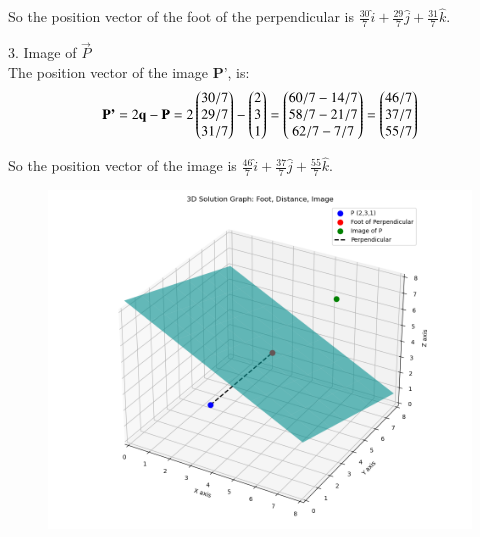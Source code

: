\documentclass[journal]{IEEEtran}
\begin{document}
So the position vector of the foot of the perpendicular is $\frac{30}{7}\hat{i} + \frac{29}{7}\hat{j} + \frac{31}{7}\hat{k}$.

3. Image of $ \vec{P}$\\

The position vector of the image $\textbf{P'}$, is:\\

\begin{align}
     \textbf{P'} = 2\textbf{q} - \textbf{P} = 2 \begin{pmatrix} 30/7 \\ 29/7 \\ 31/7 \end{pmatrix} - \begin{pmatrix} 2 \\ 3 \\ 1 \end{pmatrix} = \begin{pmatrix} 60/7 - 14/7 \\ 58/7 - 21/7 \\ 62/7 - 7/7 \end{pmatrix} = \begin{pmatrix} 46/7 \\ 37/7 \\ 55/7 \end{pmatrix}
\end{align}

So the position vector of the image is $\frac{46}{7}\hat{i} + \frac{37}{7}\hat{j} + \frac{55}{7}\hat{k}$.

\begin{figure}
    \centering
    \includegraphics[width=1\linewidth]{figs/3d_plane_solution.png}
    \caption{}
    \label{fig:placeholder}
\end{figure}
\end{document}
